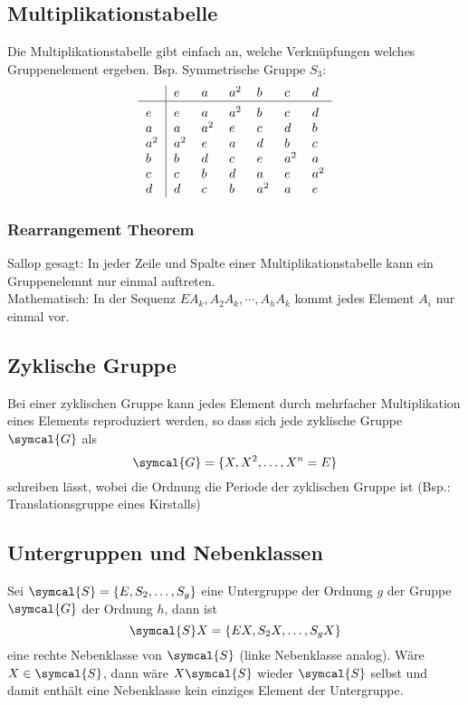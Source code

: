 \documentclass[
  captions=tableheading,  %
  titlepage=firstiscover, %
]{scrartcl}
\begin{document}
\subsection{Multiplikationstabelle}
Die Multiplikationstabelle gibt einfach an, welche Verknüpfungen welches Gruppenelement ergeben.
Bsp. Symmetrische Gruppe $S_3$:
\[
    \begin{tabular}{>{$}l<{$}|*{6}{>{$}l<{$}}}
    ~   & e   & a   & a^2 & b   & c   & d   \\
    \hline\vrule height 12pt width 0pt
    e   & e   & a   & a^2 & b   & c   & d   \\
    a   & a   & a^2 & e   & c   & d   & b   \\
    a^2 & a^2 & e   & a   & d   & b   & c   \\
    b   & b   & d   & c   & e   & a^2 & a   \\
    c   & c   & b   & d   & a   & e   & a^2 \\
    d   & d   & c   & b   & a^2 & a   & e   \\
    \end{tabular} 
\]
\subsubsection{Rearrangement Theorem}
Sallop gesagt: In jeder Zeile und Spalte einer Multiplikationstabelle kann ein Gruppenelemnt nur einmal auftreten.\\
Mathematisch: In der Sequenz $EA_k, A_2A_k, \cdots , A_h A_k$ kommt jedes Element $A_i$ nur einmal vor.
\subsection{Zyklische Gruppe}
Bei einer zyklischen Gruppe kann jedes Element durch mehrfacher Multiplikation eines Elements reproduziert werden, so dass
sich jede zyklische Gruppe $\symcal{G}$ als 
\begin{equation*}
  \symcal{G} = \{ X, X^2, \ldots, X^n = E \}
\end{equation*}
schreiben lässt, wobei die Ordnung die Periode der zyklischen Gruppe ist (Bsp.: Translationsgruppe eines Kirstalls)
\subsection{Untergruppen und Nebenklassen}
Sei $\symcal{S}  = \{E, S_2, \ldots, S_g \}$ eine Untergruppe der Ordnung $g$ der Gruppe $\symcal{G}$
der Ordnung $h$, dann ist 
\begin{equation*}
  \symcal{S}X = \{ EX, S_2X, \ldots, S_g X\}
\end{equation*}
eine rechte Nebenklasse von $\symcal{S}$ (linke Nebenklasse analog).
Wäre $X \in \symcal{S}$, dann wäre $X\symcal{S}$ wieder $\symcal{S}$ selbst und damit enthält
eine Nebenklasse kein einziges Element der Untergruppe.\\
\end{document}
